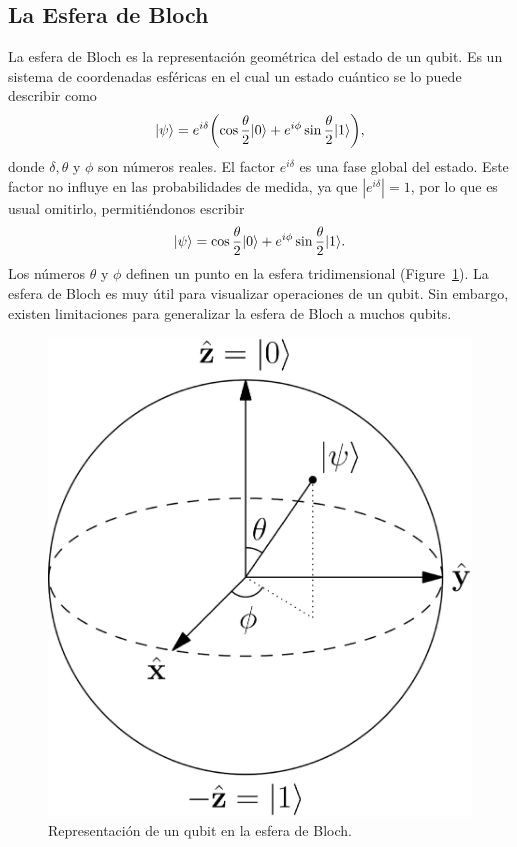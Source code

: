 \subsection{La Esfera de Bloch}
La esfera de Bloch es la representación geométrica del estado de un qubit. Es un sistema de coordenadas esféricas en el cual un estado cuántico se lo puede describir como
\begin{equation}
  \ket{\psi} = e^{i\delta} \left(\cos\dfrac{\theta}{2}\ket{0} + e^{i\phi}\sin\dfrac{\theta}{2}\ket{1}\right),
\end{equation}
donde $\delta, \theta$ y $\phi$ son números reales. 
El factor $e^{i\delta}$ es una fase global del estado. 
Este factor no influye en las probabilidades de medida, ya que $\left|e^{i\delta}\right| = 1$, por lo que es usual omitirlo, permitiéndonos escribir
\begin{equation}
  \ket{\psi} = \cos\dfrac{\theta}{2}\ket{0} + e^{i\phi}\sin\dfrac{\theta}{2}\ket{1}.
\end{equation}
Los números $\theta$ y $\phi$ definen un punto en la esfera tridimensional (Figure~\ref{fig:bloch}). 
La esfera de Bloch es muy útil para visualizar operaciones de un qubit. Sin embargo, existen limitaciones para generalizar la esfera de Bloch a muchos qubits.
\begin{figure}[ht]
  \centering
  \includegraphics[scale=0.175]{Figures/bloch-sphere.eps}
  \vspace{2mm}
  \caption{Representación de un qubit en la esfera de Bloch.}
  \label{fig:bloch}
\end{figure}

